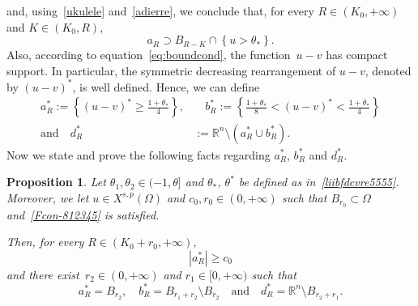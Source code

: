 \documentclass[12pt]{article}
\newcommand{\R}{\mathbb{R}}
\numberwithin{equation}{section}
\newtheorem{prop}[thm]{Proposition}
\renewcommand{\geq}{\geqslant}
\begin{document}
and, using~\eqref{ukulele} and~\eqref{adierre}, we conclude that, for every $R\in \left(K_0,+\infty\right)$ and $K\in (K_0,R)$,
\begin{equation}\label{takanaka}
a_R \supset B_{R-K}\cap \left\lbrace u>\theta_{*} \right\rbrace.
\end{equation}
Also, according to equation~\eqref{eq:boundcond}, the function~$u-v$ has compact support. In particular, the symmetric decreasing rearrangement of $u-v$, denoted by $(u-v)^*$, is well defined. Hence, we can define
\begin{equation}\label{astarebstar}
\begin{split}
a_R^*:= \left\lbrace (u-v)^*\geq \frac{1+\theta_*}{4} \right\rbrace, & \quad b_R^*:= \left\lbrace  \frac{1+\theta_*}{8}<(u-v)^*<\frac{1+\theta_*}{4}\right\rbrace\\
\mbox{and}\quad d_R^*&:=\R^n\setminus \left(a_R^*\cup b_R^*\right).
\end{split}
\end{equation}
Now we state and prove the following facts regarding $a_R^*$, $b_R^*$ and $d_R^*$. 

\begin{prop}\label{jamio-le}
Let $\theta_1,\theta_2\in (-1,\theta]$ and $\theta_*$, $\theta^*$ be defined as in~\eqref{liibfdcvre5555}. Moreover, we let $u\in X^{s,p}(\Omega)$ and $c_0,r_0\in (0,+\infty)$ such that $B_{r_0}\subset \Omega$ and~\eqref{Fcon-812345} is satisfied. 

Then, for every $R\in \left(K_0+r_0,+\infty\right)$,
\begin{equation}\label{iann-uytb}
\left|a_R^*\right|\geq c_0
\end{equation}
and there exist~$r_2\in (0,+\infty)$ and $r_1\in [0,+\infty)$ such that
\begin{equation}\label{levelsetpalle4563}
a_R^*=B_{r_2}, \quad b_R^*=B_{r_1+r_2}\setminus B_{r_2}\quad\mbox{and}\quad d_R^*=\R^n\setminus B_{r_2+r_1}.
\end{equation}
\end{prop}
\end{document}
